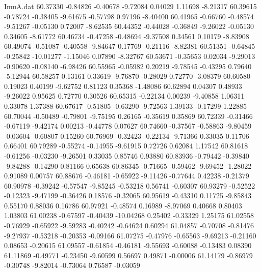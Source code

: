 \begin{filecontents}{ImuA.dat}
  60.37330   -0.84826   -0.40678   -9.72084    0.04029    1.11698   -8.21317
  60.39615   -0.78724   -0.38405   -9.61675   -0.57798    0.97196   -8.40400
  60.41965   -0.66760   -0.48574   -9.51267   -0.05130    0.72007   -8.62535
  60.44352   -0.44028   -0.36849   -9.26022   -0.05130    0.34605   -8.61772
  60.46734   -0.47258   -0.48694   -9.37508    0.34561    0.10179   -8.83908
  60.49074   -0.51087   -0.40558   -9.84647    0.17769   -0.21116   -8.82381
  60.51351   -0.64845   -0.25842  -10.01277   -1.15046    0.07890   -8.32767
  60.53671   -0.35653    0.02034   -9.29013   -0.90620   -0.08140   -6.98426
  60.55965   -0.05982    0.20219   -9.78545   -0.43295    0.79640   -5.12944
  60.58257    0.13161    0.33619   -9.76870   -0.28029    0.72770   -3.08379
  60.60580    0.19023    0.40199   -9.62752    0.81123    0.35368   -1.48086
  60.62894    0.04307    0.48933   -9.26022    0.95625    0.72770    0.30526
  60.65315   -0.22134    0.00239   -9.40858    1.06311    0.33078    1.37388
  60.67617   -0.51805   -0.63290   -9.72563    1.39133   -0.17299    1.22885
  60.70044   -0.50489   -0.79801   -9.75195    0.26165   -0.35619    0.35869
  60.72339   -0.31466   -0.67119   -9.42174    0.00213   -0.44778    0.07627
  60.74660   -0.37567   -0.58863   -9.80459   -0.03604   -0.60807    0.15260
  60.76969   -0.32423   -0.22134   -9.71366    0.33035    0.11706    0.66401
  60.79289   -0.55274   -0.14955   -9.61915    0.72726    0.62084    1.17542
  60.81618   -0.61256   -0.03230   -9.26501    0.33035    0.85746    0.93880
  60.83936   -0.79442   -0.39840   -9.84288   -0.14290    0.81166    0.65638
  60.86345   -0.71665   -0.59462   -9.69452   -1.28022    0.91089    0.00757
  60.88676   -0.46181   -0.65922   -9.11426   -0.77644    0.42238   -0.21379
  60.90978   -0.39242   -0.57547   -9.85245   -0.53218    0.56741   -0.60307
  60.93279   -0.52522   -0.12323   -9.47199   -0.36426    0.18576   -0.32065
  60.95619   -0.43310    0.11725   -9.85843    0.55170    0.88036    0.16786
  60.97921   -0.48574    0.16989   -8.97069    0.40668    0.80403    1.03803
  61.00238   -0.67597   -0.40439  -10.04268    0.25402   -0.33329    1.25175
  61.02558   -0.76929   -0.65922   -9.59283   -0.40242   -0.64624    0.60294
  61.04857   -0.70708   -0.81476   -9.27937   -0.53218   -0.20353   -0.09166
  61.07275   -0.47976   -0.65563   -9.69213   -0.21160    0.08653   -0.20615
  61.09557   -0.61854   -0.46181   -9.55693   -0.60088   -0.13483    0.08390
  61.11869   -0.49771   -0.23450   -9.60599    0.56697    0.49871   -0.00006
  61.14179   -0.86979   -0.30748   -9.82014   -0.73064    0.76587   -0.03059

\end{filecontents}
